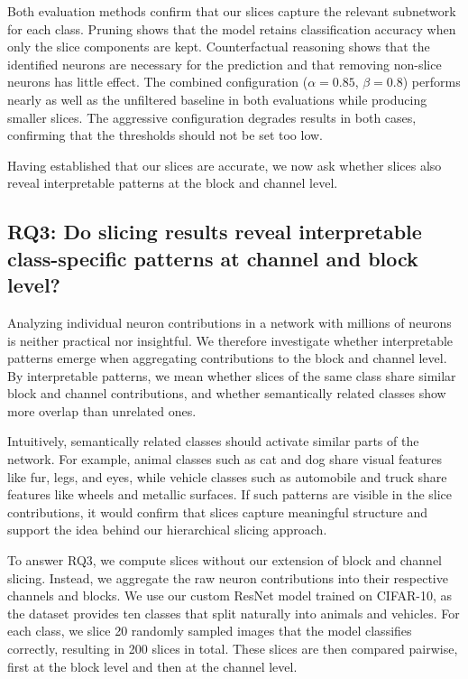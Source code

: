 \documentclass[
12pt,
fancyheadings,
a4paper,
twoside,
BCOR=0.7cm,
nobcorignoretitle,
grayscalebody,
]{stsreprt}
\begin{document}
\vspace{0.2cm}

Both evaluation methods confirm that our slices capture the relevant subnetwork for each class.
Pruning shows that the model retains classification accuracy when only the slice components are
kept.
Counterfactual reasoning shows that the identified neurons are necessary for the prediction and
that removing non-slice neurons has little effect.
The combined configuration ($\alpha{=}0.85$, $\beta{=}0.8$) performs nearly as well as the
unfiltered baseline in both evaluations while producing smaller slices.
The aggressive configuration degrades results in both cases, confirming that the thresholds should
not be set too low.

Having established that our slices are accurate, we now ask whether slices also reveal
interpretable patterns at the block and channel level.

\subsection*{RQ3: Do slicing results reveal interpretable class-specific patterns at channel and block level?}

Analyzing individual neuron contributions in a network with millions of neurons is neither
practical nor insightful.
We therefore investigate whether interpretable patterns emerge when aggregating contributions to
the block and channel level.
By interpretable patterns, we mean whether slices of the same class share similar block and channel
contributions, and whether semantically related classes show more overlap than unrelated ones.

Intuitively, semantically related classes should activate similar parts of the network.
For example, animal classes such as cat and dog share visual features like fur, legs, and eyes,
while vehicle classes such as automobile and truck share features like wheels and metallic
surfaces.
If such patterns are visible in the slice contributions, it would confirm that slices capture
meaningful structure and support the idea behind our hierarchical slicing approach.

To answer RQ3, we compute slices without our extension of block and channel slicing.
Instead, we aggregate the raw neuron contributions into their respective channels and blocks.
We use our custom ResNet model trained on CIFAR-10, as the dataset provides ten classes that split
naturally into animals and vehicles.
For each class, we slice 20 randomly sampled images that the model classifies correctly, resulting
in 200 slices in total.
These slices are then compared pairwise, first at the block level and then at the channel level.
\end{document}
